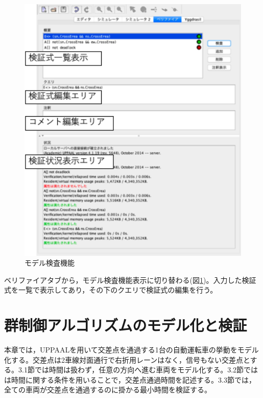 \documentclass{tpu-sotu}
\begin{document}
	\begin{figure}[htbp]
	\centering
	\includegraphics[width=120mm]{showModelVerification.png}
	\caption{モデル検査機能}
	\label{sMV}
	\end{figure}
	
	ベリファイアタブから，モデル検査機能表示に切り替わる(図\ref{sMV})。入力した検証式を一覧で表示してあり，その下のクエリで検証式の編集を行う。
	
\chapter{群制御アルゴリズムのモデル化と検証}
本章では，UPPAALを用いて交差点を通過する1台の自動運転車の挙動をモデル化する。交差点は2車線対面通行で右折用レーンはなく，信号もない交差点とする。3.1節では時間は扱わず，任意の方向へ進む車両をモデル化する。3.2節ではは時間に関する条件を用いることで，交差点通過時間を記述する。3.3節では，全ての車両が交差点を通過するのに掛かる最小時間を検証する。
\end{document}

